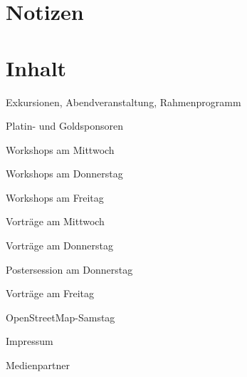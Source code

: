 \section*{Notizen}

\newpage
{}
\section*{Inhalt}
\label{contents}
\newlength\contentspace
\setlength\contentspace{0.2em}

\vspace*{\contentspace}%
\noindent Exkursionen, Abendveranstaltung, Rahmenprogramm  \dotfill \pageref{exkursionen}

\vspace*{\contentspace}%
\noindent Platin- und Goldsponsoren \dotfill \pageref{platinsposoren}

\vspace*{\contentspace}%
\noindent Workshops am Mittwoch \dotfill \pageref{mittwoch-workshops}

\vspace*{\contentspace}%
\noindent Workshops am Donnerstag \dotfill \pageref{donnerstag-workshops}

\vspace*{\contentspace}%
\noindent Workshops am Freitag \dotfill \pageref{freitag-workshops}

\vspace*{\contentspace}%
\noindent Vorträge am Mittwoch \dotfill \pageref{mittwoch}

\vspace*{\contentspace}%
\noindent Vorträge am Donnerstag \dotfill \pageref{donnerstag}

\vspace*{\contentspace}%
\noindent Postersession am Donnerstag \dotfill \pageref{donnerstag-poster}

\vspace*{\contentspace}%
\noindent Vorträge am Freitag \dotfill \pageref{freitag}

\vspace*{\contentspace}%
\noindent OpenStreetMap-Samstag \dotfill \pageref{samstag}

\vspace*{\contentspace}%
\noindent Impressum \dotfill \pageref{impressum}

\vspace*{\contentspace}%
\noindent Medienpartner \dotfill \pageref{medienpartner}

